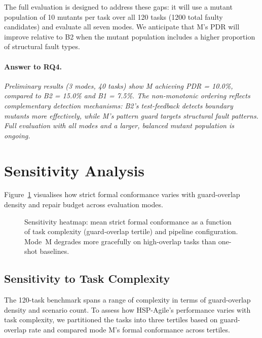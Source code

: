 The full evaluation is designed to address these gaps: it will use a mutant population
of 10 mutants per task over all 120 tasks (1200 total faulty candidates) and evaluate
all seven modes.  We anticipate that M's PDR will improve relative to B2 when the
mutant population includes a higher proportion of structural fault types.

\paragraph{Answer to RQ4.}
\emph{Preliminary results (3 modes, 40 tasks) show M achieving PDR = 10.0\%, compared
to B2 = 15.0\% and B1 = 7.5\%.  The non-monotonic ordering reflects complementary
detection mechanisms: B2's test-feedback detects boundary mutants more effectively,
while M's pattern guard targets structural fault patterns.  Full evaluation with all
modes and a larger, balanced mutant population is ongoing.}

\section{Sensitivity Analysis}
\label{sec:exp:sensitivity}

Figure~\ref{fig:sensitivity-heatmap} visualises how strict formal conformance varies
with guard-overlap density and repair budget across evaluation modes.

\begin{figure}[t]
  \centering
  \caption{Sensitivity heatmap: mean strict formal conformance as a function of
    task complexity (guard-overlap tertile) and pipeline configuration.  Mode~M
    degrades more gracefully on high-overlap tasks than one-shot baselines.}
  \label{fig:sensitivity-heatmap}
\end{figure}

\subsection{Sensitivity to Task Complexity}

The 120-task benchmark spans a range of complexity in terms of guard-overlap density
and scenario count.  To assess how HSP-Agile's performance varies with task
complexity, we partitioned the tasks into three tertiles based on guard-overlap rate
and compared mode M's formal conformance across tertiles.

